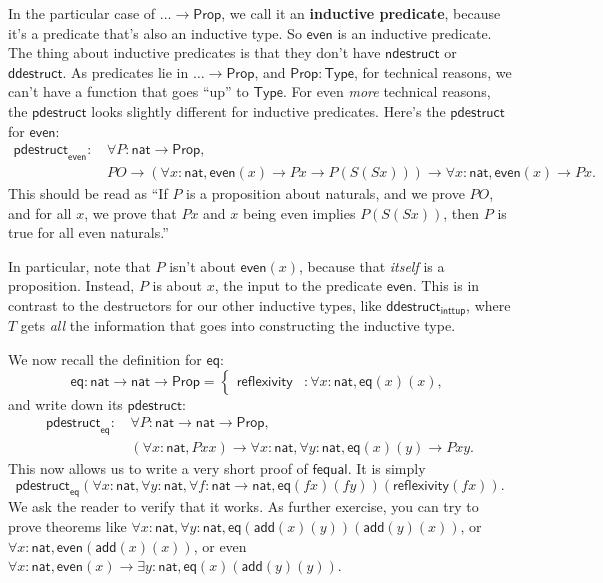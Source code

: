 \documentclass[11pt,paper=letter]{scrartcl}
\newcommand{\sf}{\mathsf}
\newcommand{\prop}{\mathsf{Prop}}
\newcommand{\type}{\mathsf{Type}}
\begin{document}
In the particular case of $\dots \to \prop$, we call it an \textbf{inductive predicate}, because it's a predicate that's also an inductive type. So $\sf{even}$ is an inductive predicate. The thing about inductive predicates is that they don't have $\sf{ndestruct}$ or $\sf{ddestruct}$. As predicates lie in $\dots \to \prop$, and $\prop : \type$, for technical reasons, we can't have a function that goes ``up'' to $\type$. For even \emph{more} technical reasons, the $\sf{pdestruct}$ looks slightly different for inductive predicates. Here's the $\sf{pdestruct}$ for $\sf{even}$:
\begin{align*}
\sf{pdestruct}_\sf{even}:\,
& \forall P: \sf{nat} \to \prop,\\
& PO \to
  (\forall x: \sf{nat}, \sf{even}(x) \to Px \to P(S(Sx))) \to
  \forall x: \sf{nat}, \sf{even}(x) \to Px.
\end{align*}
This should be read as ``If $P$ is a proposition about naturals, and we prove $PO$, and for all $x$, we prove that $Px$ and $x$ being even implies $P(S(Sx))$, then $P$ is true for all even naturals.''

In particular, note that $P$ isn't about $\sf{even}(x)$, because that \emph{itself} is a proposition. Instead, $P$ is about $x$, the input to the predicate $\sf{even}$. This is in contrast to the destructors for our other inductive types, like $\sf{ddestruct}_{\sf{inttup}}$, where $T$ gets \emph{all} the information that goes into constructing the inductive type.

We now recall the definition for $\sf{eq}$: \[
\sf{eq}: \sf{nat} \to \sf{nat} \to \prop =
  \begin{cases}
  \sf{reflexivity}&: \forall x: \sf{nat}, \sf{eq}(x)(x),
  \end{cases}
\]
and write down its $\sf{pdestruct}$:
\begin{align*}
\sf{pdestruct}_\sf{eq}:\,
& \forall P: \sf{nat} \to \sf{nat} \to \prop, \\
& (\forall x: \sf{nat}, Pxx) \to
  \forall x: \sf{nat}, \forall y: \sf{nat}, \sf{eq}(x)(y) \to Pxy.
\end{align*}
This now allows us to write a very short proof of $\sf{fequal}$. It is simply \[
  \sf{pdestruct}_\sf{eq}(\forall x: \sf{nat}, \forall y: \sf{nat}, \forall f: \sf{nat} \to \sf{nat}, \sf{eq}(fx)(fy))(\sf{reflexivity}(fx)).
\]
We ask the reader to verify that it works. As further exercise, you can try to prove theorems like $\forall x: \sf{nat}, \forall y: \sf{nat}, \sf{eq}(\sf{add}(x)(y))(\sf{add}(y)(x))$, or $\forall x: \sf{nat}, \sf{even}(\sf{add}(x)(x))$, or even $\forall x: \sf{nat}, \sf{even}(x) \to \exists y: \sf{nat}, \sf{eq}(x)(\sf{add}(y)(y))$.
\end{document}
